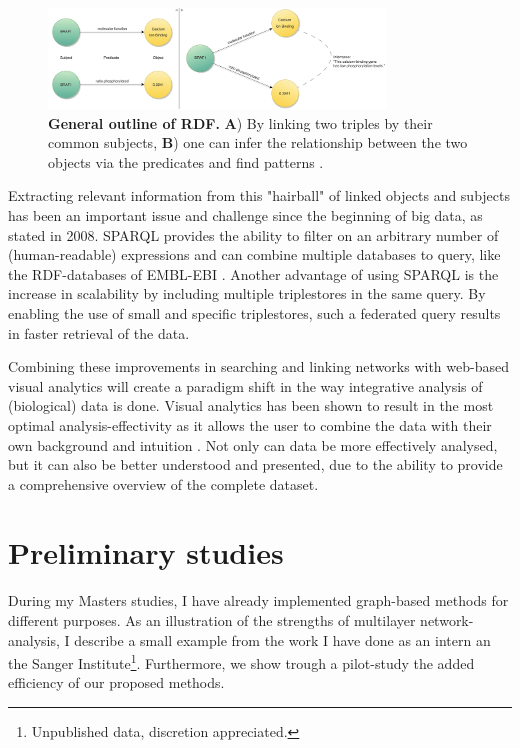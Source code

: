 \documentclass[twoside,fontsize=12pt]{article}
\begin{document}
\begin{figure}[H]
    \centering
    \includegraphics[width=0.8\textwidth]{rdf.pdf}
    \caption{\textbf{General outline of RDF.} \textbf{A}) By linking two triples by their common subjects, \textbf{B}) one can infer the relationship between the two objects via the predicates and find patterns%
    .}
    \label{fig:rdf}
\end{figure}
\noindent
Extracting relevant information from this "hairball" of linked objects and subjects has been an important issue and challenge since the beginning of big data, as \citet{Pavlopoulos2008} stated in 2008. SPARQL provides the ability to filter on an arbitrary number of (human-readable) expressions and can combine multiple databases to query, like the RDF-databases of EMBL-EBI \citep{Jupp2014}. Another advantage of using SPARQL is the increase in scalability by including multiple triplestores in the same query. By enabling the use of small and specific triplestores, such a federated query results in faster retrieval of the data.

Combining these improvements in searching and linking networks with web-based visual analytics will create a paradigm shift in the way integrative analysis of (biological) data is done. Visual analytics has been shown to result in the most optimal analysis-effectivity as it allows the user to combine the data with their own background and intuition %
. Not only can data be more effectively analysed, but it can also be better understood and presented, due to the ability to provide a comprehensive overview of the complete dataset\cite{Thomas2005, Keim}. 
\newpage
\section*{Preliminary studies}
During my Masters studies, I have already implemented graph-based methods for different purposes. As an illustration of the strengths of multilayer network-analysis, I describe a small example from the work I have done as an intern an the Sanger Institute\footnote{Unpublished data, discretion appreciated.}. Furthermore, we show trough a pilot-study the added efficiency of our proposed methods.
\end{document}
